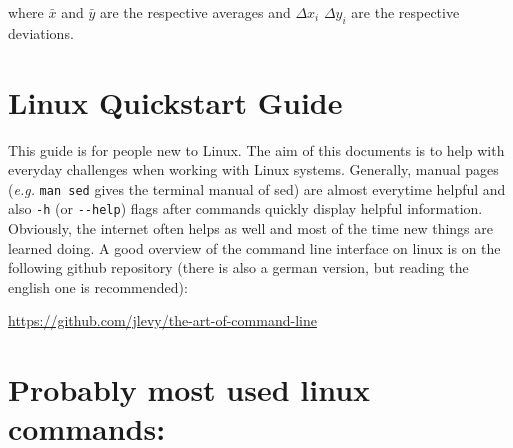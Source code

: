 \documentclass[
  letterpaper,
]{article}
\begin{document}
where \(\bar{x}\) and \(\bar{y}\) are the respective averages and
\(\Delta x_i\) \(\Delta y_i\) are the respective deviations.

\hypertarget{linux-quickstart-guide}{%
\section{Linux Quickstart Guide}\label{linux-quickstart-guide}}

This guide is for people new to Linux. The aim of this documents is to
help with everyday challenges when working with Linux systems.
Generally, manual pages (\emph{e.g.} \texttt{man\ sed} gives the
terminal manual of sed) are almost everytime helpful and also
\texttt{-h} (or \texttt{-\/-help}) flags after commands quickly display
helpful information. Obviously, the internet often helps as well and
most of the time new things are learned doing. A good overview of the
command line interface on linux is on the following github repository
(there is also a german version, but reading the english one is
recommended):

\url{https://github.com/jlevy/the-art-of-command-line}

\hypertarget{probably-most-used-linux-commands}{%
\section*{Probably most used linux
commands:}\label{probably-most-used-linux-commands}}

\end{document}
